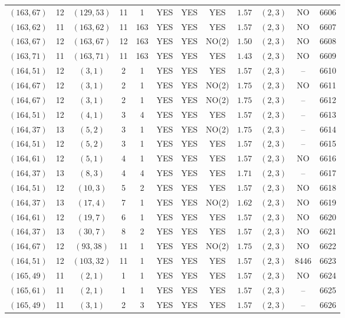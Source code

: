 \begin{longtable}{|c|c|c|c|c|c|c|c|c|c|c|c|}
$(163,67)$ & 12 & $(129,53)$ & 11 & 1 & YES & YES & YES & $1.57$ & $(2,3)$ & NO & 6606\\
$(163,62)$ & 11 & $(163,62)$ & 11 & 163 & YES & YES & YES & $1.57$ & $(2,3)$ & NO & 6607\\
$(163,67)$ & 12 & $(163,67)$ & 12 & 163 & YES & YES & NO(2) & $1.50$ & $(2,3)$ & NO & 6608\\
$(163,71)$ & 11 & $(163,71)$ & 11 & 163 & YES & YES & YES & $1.43$ & $(2,3)$ & NO & 6609\\
$(164,51)$ & 12 & $(3,1)$ & 2 & 1 & YES & YES & YES & $1.57$ & $(2,3)$ & -- & 6610\\
$(164,67)$ & 12 & $(3,1)$ & 2 & 1 & YES & YES & NO(2) & $1.75$ & $(2,3)$ & NO & 6611\\
$(164,67)$ & 12 & $(3,1)$ & 2 & 1 & YES & YES & NO(2) & $1.75$ & $(2,3)$ & -- & 6612\\
$(164,51)$ & 12 & $(4,1)$ & 3 & 4 & YES & YES & YES & $1.57$ & $(2,3)$ & -- & 6613\\
$(164,37)$ & 13 & $(5,2)$ & 3 & 1 & YES & YES & NO(2) & $1.75$ & $(2,3)$ & -- & 6614\\
$(164,51)$ & 12 & $(5,2)$ & 3 & 1 & YES & YES & YES & $1.57$ & $(2,3)$ & -- & 6615\\
$(164,61)$ & 12 & $(5,1)$ & 4 & 1 & YES & YES & YES & $1.57$ & $(2,3)$ & NO & 6616\\
$(164,37)$ & 13 & $(8,3)$ & 4 & 4 & YES & YES & YES & $1.71$ & $(2,3)$ & -- & 6617\\
$(164,51)$ & 12 & $(10,3)$ & 5 & 2 & YES & YES & YES & $1.57$ & $(2,3)$ & NO & 6618\\
$(164,37)$ & 13 & $(17,4)$ & 7 & 1 & YES & YES & NO(2) & $1.62$ & $(2,3)$ & NO & 6619\\
$(164,61)$ & 12 & $(19,7)$ & 6 & 1 & YES & YES & YES & $1.57$ & $(2,3)$ & NO & 6620\\
$(164,37)$ & 13 & $(30,7)$ & 8 & 2 & YES & YES & YES & $1.57$ & $(2,3)$ & NO & 6621\\
$(164,67)$ & 12 & $(93,38)$ & 11 & 1 & YES & YES & NO(2) & $1.75$ & $(2,3)$ & NO & 6622\\
$(164,51)$ & 12 & $(103,32)$ & 11 & 1 & YES & YES & YES & $1.57$ & $(2,3)$ & 8446 & 6623\\
$(165,49)$ & 11 & $(2,1)$ & 1 & 1 & YES & YES & YES & $1.57$ & $(2,3)$ & NO & 6624\\
$(165,61)$ & 11 & $(2,1)$ & 1 & 1 & YES & YES & YES & $1.57$ & $(2,3)$ & -- & 6625\\
$(165,49)$ & 11 & $(3,1)$ & 2 & 3 & YES & YES & YES & $1.57$ & $(2,3)$ & -- & 6626\\

\end{longtable}
